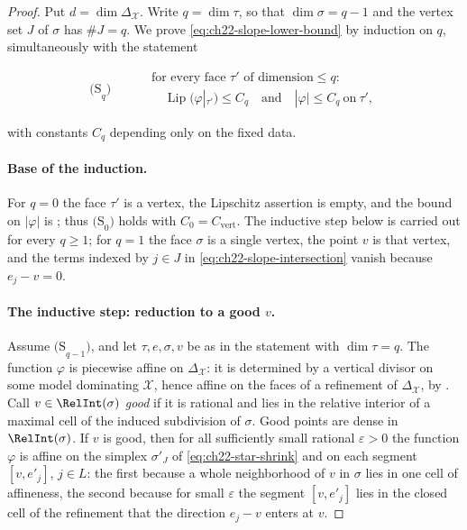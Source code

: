\begin{proof}
Put $d=\dim\Delta_{\mathcal X}$.  Write $q=\dim\tau$, so that
$\dim\sigma=q-1$ and the vertex set
$J$ of $\sigma$ has $\#J=q$.  We prove
\eqref{eq:ch22-slope-lower-bound} by induction on $q$, simultaneously with
the statement

\[
 \mathrm{(S}_q\mathrm{)}\qquad
 \begin{aligned}
 &\text{for every face }\tau'\text{ of dimension}\leq q:\\
 &\quad\operatorname{Lip}(\varphi|_{\tau'})\leq C_q
 \quad\text{and}\quad
 |\varphi|\leq C_q\ \text{on}\ \tau' ,
 \end{aligned}
\tag{22.44}\label{eq:ch22-induction-statement}
\]

with constants $C_q$ depending only on the fixed data.

\paragraph{Base of the induction.}
For $q=0$ the face $\tau'$ is a vertex, the Lipschitz assertion is
empty, and the bound on $|\varphi|$ is
; thus $\mathrm{(S}_0\mathrm{)}$ holds
with $C_0=C_{\mathrm{vert}}$.  The inductive step below is carried out for
every $q\geq1$; for $q=1$ the face $\sigma$ is a single vertex, the
point $v$ is that vertex, and the terms indexed by $j\in J$ in
\eqref{eq:ch22-slope-intersection} vanish because $e_j-v=0$.

\paragraph{The inductive step: reduction to a good $v$.}
Assume $\mathrm{(S}_{q-1}\mathrm{)}$, and let $\tau,e,\sigma,v$ be as in
the statement with $\dim\tau=q$.  The function $\varphi$ is piecewise
affine on $\Delta_{\mathcal X}$: it is determined by a vertical divisor on
some model dominating $\mathcal X$, hence affine on the faces of a
refinement of $\Delta_{\mathcal X}$, by
.  Call $v\in\RelInt(\sigma)$ \emph{good} if
it is rational and lies in the relative interior of a maximal cell of the
induced subdivision of $\sigma$.  Good points are dense in
$\RelInt(\sigma)$.  If $v$ is good, then for all sufficiently small
rational $\varepsilon>0$ the function $\varphi$ is affine on the simplex
$\sigma'_J$ of \eqref{eq:ch22-star-shrink} and on each segment
$[v,e'_j]$, $j\in L$: the first because a whole neighborhood of $v$ in
$\sigma$ lies in one cell of affineness, the second because for small
$\varepsilon$ the segment $[v,e'_j]$ lies in the closed cell of the
refinement that the direction $e_j-v$ enters at $v$.


\end{proof}
